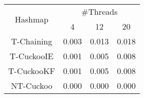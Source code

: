 \begin{tabular}{|c|c|c|c|}
\hline
\multirow{2}{*}{Hashmap} & \multicolumn{3}{c|}{\#Threads}\\\cline{2-4}& 4 & 12 & 20\\
\hline
\hline
T-Chaining & 0.003 & 0.013 & 0.018\\
T-CuckooIE & 0.001 & 0.005 & 0.008\\
T-CuckooKF & 0.001 & 0.005 & 0.008\\
NT-Cuckoo & 0.000 & 0.000 & 0.000\\
\hline
\end{tabular}
